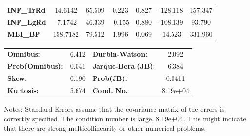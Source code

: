 \begin{center}
\begin{tabular}{lcccccc}
\textbf{INF\_TrRd} &      14.6142  &       65.509     &     0.223  &         0.827        &     -128.118    &      157.347     \\
\textbf{INF\_LgRd} &      -7.1742  &       46.339     &    -0.155  &         0.880        &     -108.139    &       93.790     \\
\textbf{MBI\_BP}   &     158.7182  &       79.512     &     1.996  &         0.069        &      -14.523    &      331.960     \\
\bottomrule
\end{tabular}
\begin{tabular}{lclc}
\textbf{Omnibus:}       &  6.412 & \textbf{  Durbin-Watson:     } &    2.092  \\
\textbf{Prob(Omnibus):} &  0.041 & \textbf{  Jarque-Bera (JB):  } &    6.384  \\
\textbf{Skew:}          &  0.190 & \textbf{  Prob(JB):          } &   0.0411  \\
\textbf{Kurtosis:}      &  5.674 & \textbf{  Cond. No.          } & 8.19e+04  \\
\bottomrule
\end{tabular}
\end{center}

Notes: \newline
 [1] Standard Errors assume that the covariance matrix of the errors is correctly specified. \newline
 [2] The condition number is large, 8.19e+04. This might indicate that there are \newline
 strong multicollinearity or other numerical problems.